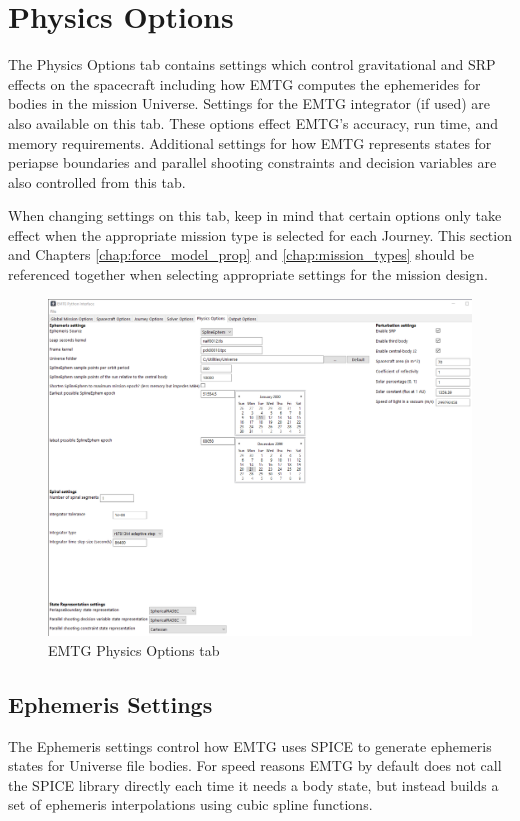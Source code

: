 \section{Physics Options}
\label{sec:physics_options}
The Physics Options tab contains settings which control gravitational and \ac{SRP} effects on the spacecraft including how \ac{EMTG} computes the ephemerides for bodies in the mission Universe. Settings for the \ac{EMTG} integrator (if used) are also available on this tab. These options effect \ac{EMTG}'s accuracy, run time, and memory requirements. Additional settings for how \ac{EMTG} represents states for periapse boundaries and parallel shooting constraints and decision variables are also controlled from this tab. 

\noindent When changing settings on this tab, keep in mind that certain options only take effect when the appropriate mission type is selected for each Journey. This section and Chapters \ref{chap:force_model_prop} and \ref{chap:mission_types} should be referenced together when selecting appropriate settings for the mission design.

    \begin{figure}[H]
        \centering
        \includegraphics[width=1.0\textwidth]{../../shared_latex_inputs/images/pyemtg_physics_options_tab.png}
        \caption{EMTG Physics Options tab}
    \end{figure}

\subsection{Ephemeris Settings}
The Ephemeris settings control how \ac{EMTG} uses \ac{SPICE} to generate ephemeris states for Universe file bodies. For speed reasons \ac{EMTG} by default does not call the \ac{SPICE} library directly each time it needs a body state, but instead builds a set of ephemeris interpolations using cubic spline functions.


